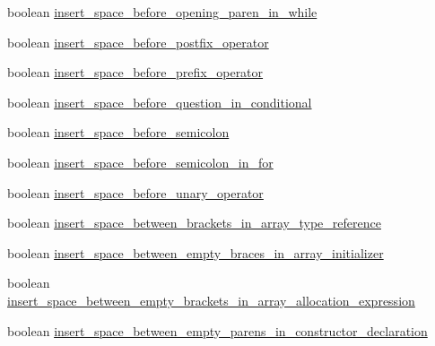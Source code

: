 \begin{DoxyCompactItemize}
\item 
boolean \hyperlink{classorg_1_1eclipse_1_1jdt_1_1ui_1_1tests_1_1refactoring_1_1infra_1_1TestFormatterOptions_ade0fd6768b1f6410fece82c116f30423}{insert\_\-space\_\-before\_\-opening\_\-paren\_\-in\_\-while}
\item 
boolean \hyperlink{classorg_1_1eclipse_1_1jdt_1_1ui_1_1tests_1_1refactoring_1_1infra_1_1TestFormatterOptions_a39ad039846a41bb8777f8fdd6a3cb2ab}{insert\_\-space\_\-before\_\-postfix\_\-operator}
\item 
boolean \hyperlink{classorg_1_1eclipse_1_1jdt_1_1ui_1_1tests_1_1refactoring_1_1infra_1_1TestFormatterOptions_aa51d0940b99d276a700108b9e10a0cb1}{insert\_\-space\_\-before\_\-prefix\_\-operator}
\item 
boolean \hyperlink{classorg_1_1eclipse_1_1jdt_1_1ui_1_1tests_1_1refactoring_1_1infra_1_1TestFormatterOptions_a610ec9e1451e8d3e5a65f0f3a7114603}{insert\_\-space\_\-before\_\-question\_\-in\_\-conditional}
\item 
boolean \hyperlink{classorg_1_1eclipse_1_1jdt_1_1ui_1_1tests_1_1refactoring_1_1infra_1_1TestFormatterOptions_a13a21fb64f9949c1fe04a3004c849c82}{insert\_\-space\_\-before\_\-semicolon}
\item 
boolean \hyperlink{classorg_1_1eclipse_1_1jdt_1_1ui_1_1tests_1_1refactoring_1_1infra_1_1TestFormatterOptions_a438ea836eddd0081792c943ee8bab728}{insert\_\-space\_\-before\_\-semicolon\_\-in\_\-for}
\item 
boolean \hyperlink{classorg_1_1eclipse_1_1jdt_1_1ui_1_1tests_1_1refactoring_1_1infra_1_1TestFormatterOptions_ab927d60f162cf7595bc0c9236280a4c4}{insert\_\-space\_\-before\_\-unary\_\-operator}
\item 
boolean \hyperlink{classorg_1_1eclipse_1_1jdt_1_1ui_1_1tests_1_1refactoring_1_1infra_1_1TestFormatterOptions_a40eda0f26112f469594f8f5071a293ba}{insert\_\-space\_\-between\_\-brackets\_\-in\_\-array\_\-type\_\-reference}
\item 
boolean \hyperlink{classorg_1_1eclipse_1_1jdt_1_1ui_1_1tests_1_1refactoring_1_1infra_1_1TestFormatterOptions_a1c5296c88487a51d5372a6bb294581ae}{insert\_\-space\_\-between\_\-empty\_\-braces\_\-in\_\-array\_\-initializer}
\item 
boolean \hyperlink{classorg_1_1eclipse_1_1jdt_1_1ui_1_1tests_1_1refactoring_1_1infra_1_1TestFormatterOptions_aad7a5045f1c98615be5da378a520d916}{insert\_\-space\_\-between\_\-empty\_\-brackets\_\-in\_\-array\_\-allocation\_\-expression}
\item 
boolean \hyperlink{classorg_1_1eclipse_1_1jdt_1_1ui_1_1tests_1_1refactoring_1_1infra_1_1TestFormatterOptions_afe828d2aa467e978dfb970dd1e49f907}{insert\_\-space\_\-between\_\-empty\_\-parens\_\-in\_\-constructor\_\-declaration}

\end{DoxyCompactItemize}
